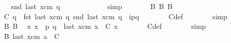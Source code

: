 \begin{isabellebody}
\ {\isachardoublequoteopen}{\isacharparenleft}{\kern0pt}\ {\isacharbar}{\kern0pt}\ snd\ {\isacharparenleft}{\kern0pt}last\ {\isacharparenleft}{\kern0pt}{\isasymC}\isactrlsub {\isasymI}\isactrlsub {\isasymmm}{\isacharhash}{\kern0pt}xcm{\isacharparenright}{\kern0pt}\ q{\isacharparenright}{\kern0pt}\ {\isacharbar}{\kern0pt}\ {\isacharparenright}{\kern0pt}\ {\isacharless}{\kern0pt}\isactrlsub {\isasymB}\ {\isasymB}\ {}{\isachardoublequoteclose}\isanewline
\ \ \ \ \ \ \isamarkupfalse%
\ simp\isanewline
\ \ \ \ \isamarkupfalse%
\ \isamarkupfalse%
\ B{}\ B{}\ B{}{}\isanewline
\ \ \ \ \isamarkupfalse%
\ {\isachardoublequoteopen}C{}\ q\ {\isacharequal}{\kern0pt}\ {\isacharparenleft}{\kern0pt}fst\ {\isacharparenleft}{\kern0pt}last\ {\isacharparenleft}{\kern0pt}{\isasymC}\isactrlsub {\isasymI}\isactrlsub {\isasymmm}{\isacharhash}{\kern0pt}xcm{\isacharparenright}{\kern0pt}\ q{\isacharparenright}{\kern0pt}{\isacharcomma}{\kern0pt}\ snd\ {\isacharparenleft}{\kern0pt}last\ {\isacharparenleft}{\kern0pt}{\isasymC}\isactrlsub {\isasymI}\isactrlsub {\isasymmm}{\isacharhash}{\kern0pt}xcm{\isacharparenright}{\kern0pt}\ q{\isacharparenright}{\kern0pt}\ {\isasymcdot}\ {\isacharbrackleft}{\kern0pt}i\isactrlbsup p{\isasymrightarrow}q\isactrlesup {\isacharbrackright}{\kern0pt}{\isacharparenright}{\kern0pt}{\isachardoublequoteclose}\isanewline
\ \ \ \ \ \ \isamarkupfalse%
\ C{}{\isacharunderscore}{\kern0pt}def\isanewline
\ \ \ \ \ \ \isamarkupfalse%
\ simp\isanewline
\ \ \ \ \isamarkupfalse%
\ \isamarkupfalse%
\ B{}\ B{}\ \isamarkupfalse%
\ {\isachardoublequoteopen}{\isasymforall}x{\isachardot}{\kern0pt}\ x\ {\isasymnotin}\ {\isacharbraceleft}{\kern0pt}p{\isacharcomma}{\kern0pt}\ q{\isacharbraceright}{\kern0pt}\ {\isasymlongrightarrow}\ last\ {\isacharparenleft}{\kern0pt}{\isasymC}\isactrlsub {\isasymI}\isactrlsub {\isasymmm}{\isacharhash}{\kern0pt}xcm{\isacharparenright}{\kern0pt}\ x\ {\isacharequal}{\kern0pt}\ C{}\ x{\isachardoublequoteclose}\isanewline
\ \ \ \ \ \ \isamarkupfalse%
\ C{}{\isacharunderscore}{\kern0pt}def\isanewline
\ \ \ \ \ \ \isamarkupfalse%
\ simp\isanewline
\ \ \ \ \isamarkupfalse%
\ \isamarkupfalse%
\ B{}{}{\isacharcolon}{\kern0pt}\ {\isachardoublequoteopen}last\ {\isacharparenleft}{\kern0pt}{\isasymC}\isactrlsub {\isasymI}\isactrlsub {\isasymmm}{\isacharhash}{\kern0pt}xcm{\isacharparenright}{\kern0pt}\ {\isasymmidarrow}{\isasymlangle}a{\isacharcomma}{\kern0pt}\ {}{\isasymrangle}{\isasymrightarrow}\ C{}{\isachardoublequoteclose}\isanewline

\end{isabellebody}
